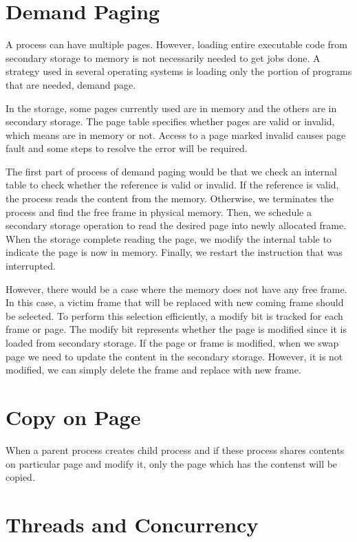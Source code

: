 \section{Demand Paging}
\label{sec:history}
A process can have multiple pages. However, loading entire executable code from secondary storage to memory is not necessarily needed to 
get jobs done. A strategy used in several operating systems is loading only the portion of programs that are needed, demand page. 

In the storage, some pages currently used are in memory and the others are in secondary storage. 
The page table specifies whether pages are valid or invalid, which means are in memory or not. 
Access to a page marked invalid causes page fault and some steps to resolve the error will be required. 

The first part of process of demand paging would be that we check an internal table to check whether the reference is valid or invalid.
If the reference is valid, the process reads the content from the memory. Otherwise, we terminates the process and find the free frame in 
physical memory. Then, we schedule a secondary storage operation to read the desired page into newly allocated frame. 
When the storage complete reading the page, we modify the internal table to indicate the page is now in memory. 
Finally, we restart the instruction that was interrupted. 

However, there would be a case where the memory does not have any free frame. In this case, a victim frame that will be replaced with new coming frame should be selected. 
To perform this selection efficiently, a modify bit is tracked for each frame or page. The modify bit represents whether the page is modified since it is loaded from secondary storage. 
If the page or frame is modified, when we swap page we need to update the content in the secondary storage. However, it is not modified, we can simply delete the frame and replace with new frame.



\section{Copy on Page}
\label{sec:history}
When a parent process creates child process and if these process shares contents on particular page and modify it, 
only the page which has the contenst will be copied.


\section{Threads and Concurrency}
\label{sec:history}

